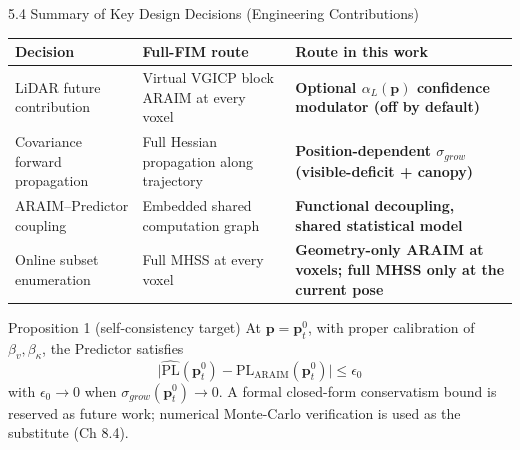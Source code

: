 \documentclass[10pt,aspectratio=169,xcolor=dvipsnames]{beamer}
\newcommand{\PL}{\mathrm{PL}}
\newcommand{\1}{\mathbb{1}}
\newcommand{\innov}[1]{\textcolor{NavyBlue}{\textbf{#1}}}
\begin{document}
\begin{frame}{5.4 Summary of Key Design Decisions (Engineering Contributions)}
  \footnotesize
  \begin{table}
    \begin{tabular}{p{} p{} p{}}
      \toprule
      \textbf{Decision} & \textbf{Full-FIM route} & \textbf{Route in this work}\\
      \midrule
      LiDAR future contribution & Virtual VGICP block ARAIM at every voxel & \innov{Optional $\alpha_L(\bm{p})$ confidence modulator (off by default)}\\
      Covariance forward propagation & Full Hessian propagation along trajectory & \innov{Position-dependent $\sigma_{grow}$ (visible-deficit + canopy)}\\
      ARAIM--Predictor coupling & Embedded shared computation graph & \innov{Functional decoupling, shared statistical model}\\
      Online subset enumeration & Full MHSS at every voxel & \innov{Geometry-only ARAIM at voxels; full MHSS only at the current pose}\\
      \bottomrule
    \end{tabular}
  \end{table}

  \medskip
  \begin{block}{\small Proposition 1 (self-consistency target)}
    \scriptsize At $\bm{p}=\bm{p}_t^0$, with proper calibration of $\beta_v,\beta_\kappa$, the Predictor satisfies
    \[
      \bigl|\widehat{\PL}(\bm{p}_t^0)-\PL_{\mathrm{ARAIM}}(\bm{p}_t^0)\bigr|\le \epsilon_0
    \]
    with $\epsilon_0\to 0$ when $\sigma_{grow}(\bm{p}_t^0)\to 0$. A formal closed-form conservatism bound is reserved as future work; numerical Monte-Carlo verification is used as the substitute (Ch 8.4).
  \end{block}
\end{frame}
\end{document}
